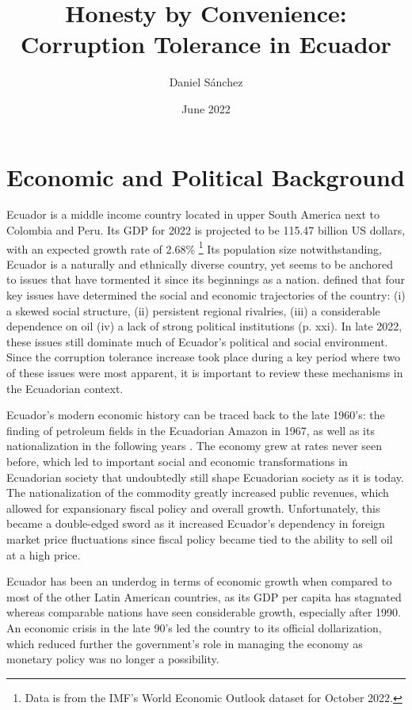 \documentclass[12pt,a4]{article}
\title{Honesty by Convenience: Corruption Tolerance in Ecuador}
\author{Daniel Sánchez}
\date{June 2022}
\begin{document}

\section{Economic and Political Background}
\label{sec:background}

Ecuador is a middle income country located in upper South America next to Colombia and Peru. Its GDP for 2022 is projected to be 115.47 billion US dollars, with an expected growth rate of 2.68\% \footnote{Data is from the IMF's World Economic Outlook dataset for October 2022.} Its population size notwithstanding, Ecuador is a naturally and ethnically diverse country, yet seems to be anchored to issues that have tormented it since its beginnings as a nation. \textcite{FederalResearchDivision.1991} defined that four key issues have determined the social and economic trajectories of the country: (i) a skewed social structure, (ii) persistent regional rivalries, (iii) a considerable dependence on oil (iv) a lack of strong political institutions (p. xxi). In late 2022, these issues still dominate much of Ecuador's political and social environment. Since the corruption tolerance increase took place during a key period where two of these issues were most apparent, it is important to review these mechanisms in the Ecuadorian context. 

Ecuador's modern economic history can be traced back to the late 1960's: the finding of petroleum fields in the Ecuadorian Amazon in 1967, as well as its nationalization in the following years \parencite{EmpresaPublicaPetroEcuador.2013}. The economy grew at rates never seen before, which led to important social and economic transformations in Ecuadorian society \textcite{Hurtado.2007, FederalResearchDivision.1991} that undoubtedly still shape Ecuadorian society as it is today. The nationalization of the commodity greatly increased public revenues, which allowed for expansionary fiscal policy and overall growth. Unfortunately, this became a double-edged sword as it increased Ecuador’s dependency in foreign market price fluctuations since fiscal policy became tied to the ability to sell oil at a high price.

Ecuador has been an underdog in terms of economic growth when compared to most of the other Latin American countries, as its GDP per capita has stagnated whereas comparable nations have seen considerable growth, especially after 1990. An economic crisis in the late 90's led the country to its official dollarization, which reduced further the government's role in managing the economy as monetary policy was no longer a possibility. 
\end{document}
